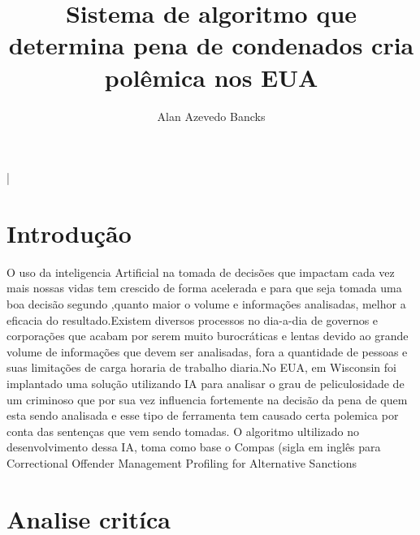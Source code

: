 \documentclass[11pt,twocolumn]{article}
\title{Sistema de algoritmo que determina pena de condenados cria polêmica nos EUA}
\author{Alan Azevedo Bancks}
\begin{document}
\maketitle

|%



\section{Introdução}


O uso da inteligencia Artificial na tomada de decisões que impactam cada vez mais nossas vidas tem crescido 
de forma acelerada e para que seja tomada uma boa decisão segundo  ,quanto maior o volume e informações analisadas, melhor 
a eficacia do resultado.Existem diversos processos no dia-a-dia de governos e corporações que acabam por serem muito burocráticas e lentas devido ao grande volume de informações que devem ser analisadas, fora a quantidade de pessoas e suas limitações de carga horaria de trabalho diaria.No EUA, em Wisconsin foi implantado uma solução utilizando IA para analisar o grau de peliculosidade de um criminoso que por sua vez 
influencia fortemente na decisão da pena de quem esta sendo analisada e esse tipo de ferramenta tem causado certa polemica por conta
das sentenças que vem sendo tomadas. O algoritmo ultilizado no desenvolvimento dessa IA, toma como base o Compas (sigla em inglês para Correctional Offender Management Profiling for Alternative Sanctions


\section{Analise critíca}
\end{document}
